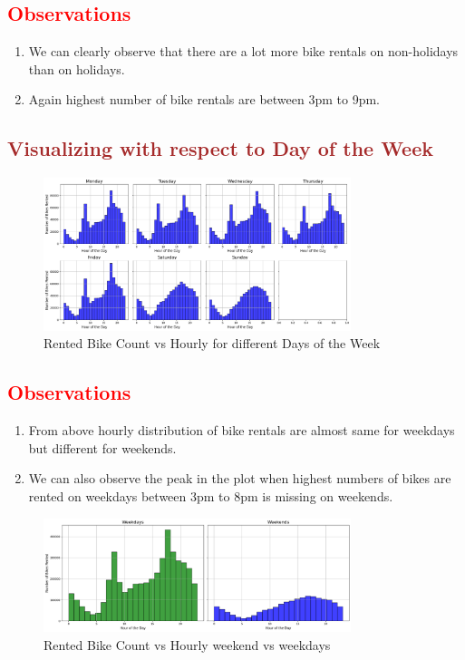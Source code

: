 \documentclass[12pt, letterpaper]{article}
\begin{document}
\subsection*{\textcolor{red}{Observations}}
\begin{enumerate}
  \item We can clearly observe that there are a lot more bike rentals on non-holidays than on holidays.
  \item Again highest number of bike rentals are between 3pm to 9pm.
\end{enumerate}

\newpage

\subsection*{\textcolor{brown}{Visualizing with respect to Day of the Week}}
\begin{figure}[h]
  \centering
  \includegraphics[width=0.8\textwidth]{day1.png}
  \caption{Rented Bike Count vs Hourly for different Days of the Week}
\end{figure}

\subsection*{\textcolor{red}{Observations}}
\begin{enumerate}
  \item From above hourly distribution of bike rentals are almost same for weekdays but different for weekends.
  \item We can also observe the peak in the plot when highest numbers of bikes are rented on weekdays between 3pm to 8pm is missing on weekends.
\end{enumerate}

\begin{figure}[h]
  \centering
  \includegraphics[width=0.8\textwidth]{weekday1.png}
  \caption{Rented Bike Count vs Hourly weekend vs weekdays}
\end{figure}
\end{document}
